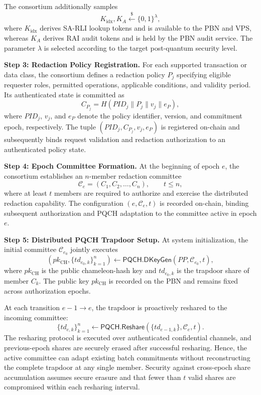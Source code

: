 \documentclass[lettersize,journal]{IEEEtran}
\begin{document}
The consortium additionally samples
\begin{equation}
K_{\mathrm{idx}},K_A
\stackrel{\$}{\leftarrow}\{0,1\}^{\lambda},
\end{equation}
where $K_{\mathrm{idx}}$ derives SA-RLI lookup tokens and is available
to the PBN and VPS, whereas $K_A$ derives RAI audit tokens and is held
by the PBN audit service. The parameter $\lambda$ is selected according
to the target post-quantum security level.

\textbf{Step 3: Redaction Policy Registration.}
For each supported transaction or data class, the consortium defines a
redaction policy $P_j$ specifying eligible requester roles, permitted
operations, applicable conditions, and validity period. Its authenticated
state is committed as
\begin{equation}
C_{P_j}
=
H(PID_j\parallel P_j\parallel v_j\parallel e_P),
\end{equation}
where $PID_j$, $v_j$, and $e_P$ denote the policy identifier, version,
and commitment epoch, respectively. The tuple
$(PID_j,C_{P_j},v_j,e_P)$ is registered on-chain and subsequently binds
request validation and redaction authorization to an authenticated
policy state.

\textbf{Step 4: Epoch Committee Formation.}
At the beginning of epoch $e$, the consortium establishes an
$n$-member redaction committee
\begin{equation}
\mathcal{C}_e=(C_1,C_2,\ldots,C_n),\qquad t\leq n,
\end{equation}
where at least $t$ members are required to authorize and exercise the
distributed redaction capability. The configuration
$(e,\mathcal{C}_e,t)$ is recorded on-chain, binding subsequent
authorization and PQCH adaptation to the committee active in epoch $e$.

\textbf{Step 5: Distributed PQCH Trapdoor Setup.}
At system initialization, the initial committee
$\mathcal{C}_{e_0}$ jointly executes
\begin{equation}
(pk_{\mathrm{CH}},\{td_{e_0,k}\}_{k=1}^{n})
\leftarrow
\mathsf{PQCH.DKeyGen}(PP,\mathcal{C}_{e_0},t),
\end{equation}
where $pk_{\mathrm{CH}}$ is the public chameleon-hash key and
$td_{e_0,k}$ is the trapdoor share of member $C_k$.
The public key $pk_{\mathrm{CH}}$ is recorded on the PBN and remains
fixed across authorization epochs.

At each transition $e-1\rightarrow e$, the trapdoor is proactively
reshared to the incoming committee:
\begin{equation}
\{td_{e,k}\}_{k=1}^{n}
\leftarrow
\mathsf{PQCH.Reshare}
(\{td_{e-1,k}\},\mathcal{C}_e,t).
\end{equation}
The resharing protocol is executed over authenticated confidential
channels, and previous-epoch shares are securely erased after successful
resharing. Hence, the active committee can adapt existing batch
commitments without reconstructing the complete trapdoor at any single
member. Security against cross-epoch share accumulation assumes secure
erasure and that fewer than $t$ valid shares are compromised within
each resharing interval.
\end{document}
